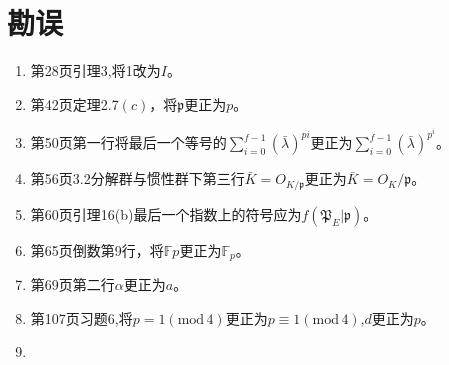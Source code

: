 \documentclass[12pt, a4paper]{ctexart}
\renewcommand{\mod}[1]{(\text{mod}\,#1)}
\begin{document}
\section{勘误}
\begin{enumerate}
    \item 第28页引理3,将1改为$I$。
    \item 第42页定理2.7$(c)$，将$\mathfrak{p}$更正为$p$。
    \item 第50页第一行将最后一个等号的$\sum_{i=0}^{f-1}(\bar{\lambda})^{pi}$更正为$\sum_{i=0}^{f-1}(\bar{\lambda})^{p^i}$。
    \item 第56页3.2分解群与惯性群下第三行$\bar{K}=O_{K/\mathfrak{p}}$更正为$\bar{K}=O_{K}/\mathfrak{p}$。
    \item 第60页引理16(b)最后一个指数上的符号应为$f(\mathfrak{P}_{E}|\mathfrak{p})$。
    \item 第65页倒数第9行，将$\mathbb{F}p$更正为$\mathbb{F}_p$。
    \item 第69页第二行$\alpha$更正为$a$。
    \item 第107页习题6,将$p=1\mod{4}$更正为$p\equiv 1\mod{4}$,$d$更正为$p$。
    \item 
\end{enumerate}
\newpage




\end{document}
